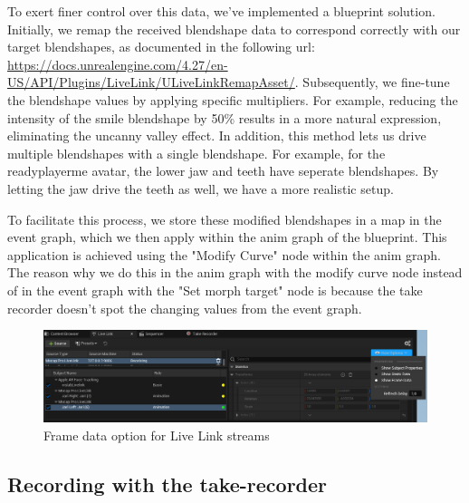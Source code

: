 \documentclass{uva-inf-article}
\begin{document}
To exert finer control over this data, we've implemented a blueprint solution. Initially, we remap the received blendshape data to correspond correctly with our target blendshapes, as documented in the following url: \url{https://docs.unrealengine.com/4.27/en-US/API/Plugins/LiveLink/ULiveLinkRemapAsset/}. Subsequently, we fine-tune the blendshape values by applying specific multipliers. For example, reducing the intensity of the smile blendshape by 50\% results in a more natural expression, eliminating the uncanny valley effect.
In addition, this method lets us drive multiple blendshapes with a single blendshape. For example, for the readyplayerme avatar, the lower jaw and teeth have seperate blendshapes. By letting the jaw drive the teeth as well, we have a more realistic setup.

To facilitate this process, we store these modified blendshapes in a map in the event graph, which we then apply within the anim graph of the blueprint. This application is achieved using the "Modify Curve" node within the anim graph. The reason why we do this in the anim graph with the modify curve node instead of in the event graph with the "Set morph target" node is because the take recorder doesn't spot the changing values from the event graph.



\begin{figure}[hbt!]
    \centering
    \includegraphics[width=\textwidth]{imgs/livelinkoptions.png}
    \caption{Frame data option for Live Link streams}
    \label{fig:livelinkoptions}
\end{figure}

\subsection{Recording with the take-recorder}


\printbibliography



\end{document}
